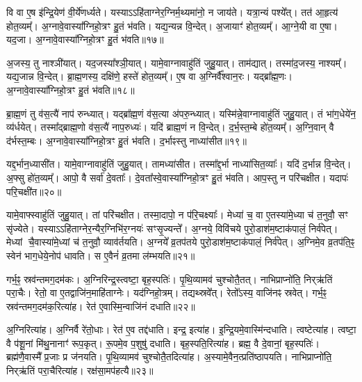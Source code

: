 वि वा ए॒ष इ॑न्द्रि॒येण॑ वी॒र्ये॑णर्ध्यते।
यस्याऽऽहि॑ताग्ने\-र॒ग्निर्म॒थ्य\-मा॑नो॒ न जाय॑ते।
यत्रा॒न्यं पश्ये᳚त्।
तत॑ आ॒हृत्य॑ होत॒व्यम्᳚।
अ॒ग्नावे॒वास्या᳚ग्निहो॒त्रꣳ हु॒तं भ॑वति।
यद्य॒न्यन्न वि॒न्देत्।
अ॒जायाꣳ॑ होत॒व्यम्᳚।
आ॒ग्ने॒यी वा ए॒षा।
यद॒जा।
अ॒ग्नावे॒वास्या᳚ग्निहो॒त्रꣳ हु॒तं भ॑वति॥१७॥\ip

अ॒जस्य॒ तु नाश्ञी॑यात्।
यद॒जस्या᳚श्ञी॒यात्।
यामे॒वाग्नावाहु॑तिं जुहु॒यात्।
ताम॑द्यात्।
तस्मा॑द॒जस्य॒ नाश्यम्᳚।
यद्य॒जान्न वि॒न्देत्।
ब्रा॒ह्म॒णस्य॒ दक्षि॑णे॒ हस्ते॑ होत॒व्यम्᳚।
ए॒ष वा अ॒ग्निर्वै᳚श्वान॒रः।
यद्ब्रा᳚ह्म॒णः।
अ॒ग्नावे॒वास्या᳚ग्निहो॒त्रꣳ हु॒तं भ॑वति॥१८॥\ip

ब्रा॒ह्म॒णं तु व॑स॒त्यै॑ नाप॑ रुन्ध्यात्।
यद्ब्रा᳚ह्म॒णं व॑स॒त्या अ॑परु॒न्ध्यात्।
यस्मि॑न्ने॒वाग्नावाहु॑तिं जुहु॒यात्।
तं भा॑ग॒धेये॑न॒ व्य॑र्धयेत्।
तस्मा᳚द्ब्राह्म॒णो व॑स॒त्यै॑ नाप॒रुध्यः॑।
यदि॑ ब्राह्म॒णं न वि॒न्देत्।
द॒र्भ॒स्त॒म्बे हो॑त॒व्यम्᳚।
अ॒ग्नि॒वान् वै द॑र्भस्त॒म्बः।
अ॒ग्नावे॒वास्या᳚ग्निहो॒त्रꣳ हु॒तं भ॑वति।
द॒र्भाꣴस्तु नाध्या॑सीत॥१९॥\ip

यद्द॒र्भान॒ध्यासी॑त।
यामे॒वाग्नावाहु॑तिं जुहु॒यात्।
तामध्या॑सीत।
तस्मा᳚द्द॒र्भा नाध्या॑सित॒व्याः᳚।
यदि॑ द॒र्भान्न वि॒न्देत्।
अ॒फ्सु हो॑त॒व्यम्᳚।
आपो॒ वै सर्वा॑ दे॒वताः᳚।
दे॒वता᳚स्वे॒वास्या᳚ग्निहो॒त्रꣳ हु॒तं भ॑वति।
आप॒स्तु न परि॑चक्षीत।
यदापः॑ परि॒चक्षी॑त॥२०॥\ip

यामे॒वाफ्स्वाहु॑तिं जुहु॒यात्।
तां परि॑चक्षीत।
तस्मा॒दापो॒ न प॑रि॒चक्ष्याः᳚।
मेध्या॑ च॒ वा ए॒तस्या॑मे॒ध्या च॑ त॒नुवौ॒ सꣳ सृ॑ज्येते।
यस्याऽऽहि॑ताग्नेर॒न्यैर॒ग्निभि॑र॒ग्नयः॑ सꣳसृ॒ज्यन्ते᳚।
अ॒ग्नये॒ विवि॑चये पुरो॒डाश॑म॒ष्टा\-क॑पालं॒ निर्व॑पेत्।
मेध्यां चै॒वास्या॑मे॒ध्यां च॑ त॒नुवौ॒ व्याव॑र्तयति।
अ॒ग्नये᳚ व्र॒तप॑तये पुरो॒डाश॑म॒ष्टा\-क॑पालं॒ निर्व॑पेत्।
अ॒ग्निमे॒व व्र॒तप॑ति॒ꣴ॒ स्वेन॑ भाग॒धेये॒नोप॑ धावति।
स ए॒वैनं॑ व्र॒तमा ल॑म्भयति॥२१॥\ip

गर्भ॒ꣴ॒ स्रव॑न्तमग॒दम॑कः।
अ॒ग्निरिन्द्र॒स्त्वष्टा॒ बृह॒स्पतिः॑।
पृ॒थि॒व्यामव॑ चुश्चोतै॒तत्।
नाभि\-प्राप्नो॑ति॒ निर्‌\mbox{}ऋ॑तिं परा॒चैः।
रेतो॒ वा ए॒तद्वाजि॑न॒माहि॑ताग्नेः।
यद॑ग्निहो॒त्रम्।
तद्यथ्स्रवे᳚त्।
रेतो᳚\-ऽस्य॒ वाजि॑नꣴ स्रवेत्।
गर्भ॒ꣴ॒ स्रव॑न्तमग॒दम॑क॒रित्या॑ह।
रेत॑ ए॒वास्मि॒न्वाजि॑नं दधाति॥२२॥\ip

अ॒ग्निरित्या॑ह।
अ॒ग्निर्वै रे॑तो॒धाः।
रेत॑ ए॒व तद्द॑धाति।
इन्द्र॒ इत्या॑ह।
इ॒न्द्रि॒यमे॒वास्मि॑न्दधाति।
त्वष्टेत्या॑ह।
त्वष्टा॒ वै प॑शू॒नां मि॑थु॒नानाꣳ॑ रूप॒कृत्।
रू॒पमे॒व प॒शुषु॑ दधाति।
बृह॒स्पति॒रित्या॑ह।
ब्रह्म॒ वै दे॒वानां॒ बृह॒स्पतिः॑।
ब्रह्म॑णै॒वास्मै᳚ प्र॒जाः प्र ज॑नयति।
पृ॒थि॒व्यामव॑ चुश्चोतै॒तदित्या॑ह।
अ॒स्यामे॒वैन॒त्प्रति॑\-ष्ठापयति।
नाभिप्राप्नो॑ति॒ निर्‌\mbox{}ऋ॑तिं परा॒चैरित्या॑ह।
रक्ष॑सा॒मप॑हत्यै॥२३॥\ip{}

